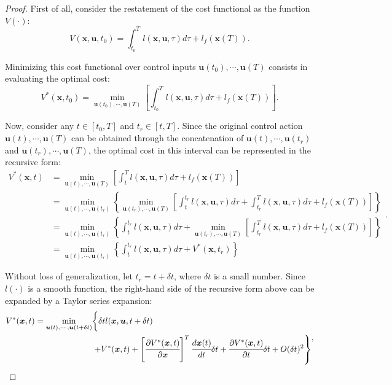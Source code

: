 \documentclass[a4paper,11pt]{book}
\numberwithin{figure}{chapter}
\numberwithin{equation}{chapter}
\numberwithin{table}{chapter}
\theoremstyle{definition}
\begin{document}
\begin{proof}
    First of all, consider the restatement of the cost functional as the function $V(\cdot)$:
    \begin{equation}
        V(\bm{x}, \bm{u}, t_0) = \int_{t_0}^T l(\bm{x}, \bm{u}, \tau) d \tau + l_f(\bm{x}(T))
    .\end{equation}
    
    Minimizing this cost functional over control inputs $\bm{u}(t_0), \cdots, \bm{u}(T)$ consists in evaluating the optimal cost:
    \begin{equation}
        V^*(\bm{x}, t_0) = \min_{\bm{u}(t_0), \cdots, \bm{u}(T)} \left[ \int_{t_0}^T l(\bm{x}, \bm{u}, \tau) d \tau + l_f(\bm{x}(T)) \right]
    .\end{equation}
    
    Now, consider any $t \in [t_0, T]$ and $t_r \in [t, T]$. Since the original control action $\bm{u}(t), \cdots, \bm{u}(T)$ can be obtained through the concatenation of $\bm{u}(t), \cdots, \bm{u}(t_r)$ and $\bm{u}(t_r), \cdots, \bm{u}(T)$, the optimal cost in this interval can be represented in the recursive form:
    \begin{equation} \label{eq:HJERecursive}
    \begin{split}
    V^*(\bm{x}, t) &= \min_{\bm{u}(t), \cdots, \bm{u}(T)} \left[ \int_{t}^T l(\bm{x}, \bm{u}, \tau) d \tau + l_f(\bm{x}(T)) \right] \\
        &= \min_{\bm{u}(t), \cdots, \bm{u}(t_r)} \left\{ \min_{\bm{u}(t_r), \cdots, \bm{u}(T)} \left[ \int_{t}^{t_r} l(\bm{x}, \bm{u}, \tau) d \tau + \int_{t_r}^{T} l(\bm{x}, \bm{u}, \tau) d \tau + l_f(\bm{x}(T)) \right] \right\} \\
        &= \min_{\bm{u}(t), \cdots, \bm{u}(t_r)} \left\{ \int_{t}^{t_r} l(\bm{x}, \bm{u}, \tau) d \tau + \min_{\bm{u}(t_r), \cdots, \bm{u}(T)} \left[ \int_{t_r}^{T} l(\bm{x}, \bm{u}, \tau) d \tau + l_f(\bm{x}(T)) \right] \right\} \\
        &= \min_{\bm{u}(t), \cdots, \bm{u}(t_r)} \left\{ \int_{t}^{t_r} l(\bm{x}, \bm{u}, \tau) d \tau + V^*(\bm{x}, t_r) \right\}
    \end{split}
    .\end{equation}
    
    Without loss of generalization, let $t_r = t + \delta t$, where $\delta t$ is a small number. Since $l(\cdot)$ is a smooth function, the right-hand side of the recursive form above can be expanded by a Taylor series expansion:
    \begin{equation}
    \begin{split}
        V^*(\bm{x}, t) = \min_{\bm{u}(t), \cdots, \bm{u}(t+\delta t)} & \biggl\{ \delta t l(\bm{x}, \bm{u}, t + \delta t) \biggr. \\ 
        & \left. + V^*(\bm{x}, t) + \left[ \cfrac{\partial V^*(\bm{x}, t)}{\partial \bm{x}} \right]^T \cfrac{d \bm{x}(t)}{dt} \delta t + \cfrac{\partial V^*(\bm{x}, t)}{\partial t} \delta t + O(\delta t)^2  \right\}
    \end{split}
    ,\end{equation}
    

\end{proof}
\end{document}
